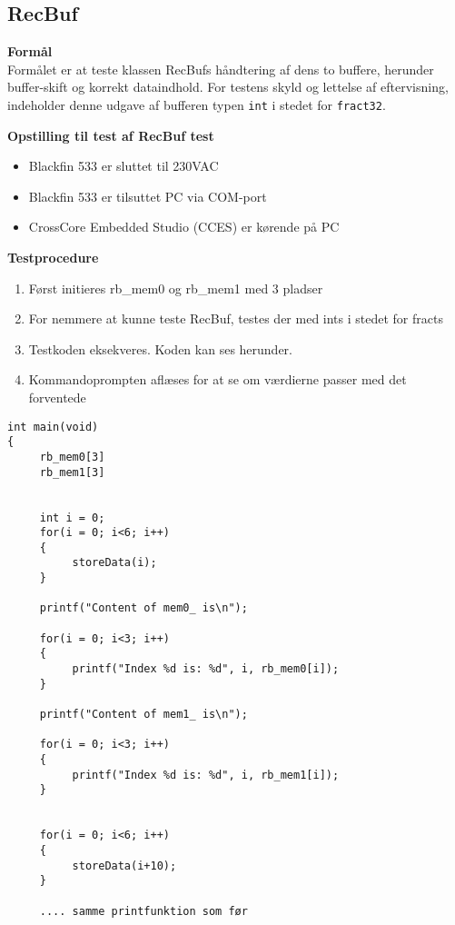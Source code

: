 \subsection*{RecBuf}

\textbf{Formål} \\
Formålet er at teste klassen RecBufs håndtering af dens to buffere, herunder buffer-skift og korrekt dataindhold. For testens skyld og lettelse af eftervisning, indeholder denne udgave af bufferen typen \verb+int+ i stedet for \verb+fract32+.

\textbf{Opstilling til test af RecBuf test}

\begin{itemize}
	\item Blackfin 533 er sluttet til 230VAC
	\item Blackfin 533 er tilsuttet PC via COM-port
	\item CrossCore Embedded Studio (CCES) er kørende på PC
\end{itemize}

\textbf{Testprocedure}
\begin{enumerate}
	\item Først initieres rb\_mem0 og rb\_mem1 med 3 pladser  
	\item For nemmere at kunne teste RecBuf, testes der med ints i stedet for fracts
	\item Testkoden eksekveres. Koden kan ses herunder. 
	\item Kommandoprompten aflæses for at se om værdierne passer med det forventede
\end{enumerate}

\begin{verbatim}
int main(void)
{
     rb_mem0[3]
     rb_mem1[3]
     
     
     int i = 0;
     for(i = 0; i<6; i++)
     {
          storeData(i);
     }
     
     printf("Content of mem0_ is\n");
     
     for(i = 0; i<3; i++)
     {
          printf("Index %d is: %d", i, rb_mem0[i]);
     }
     
     printf("Content of mem1_ is\n");
     
     for(i = 0; i<3; i++)
     {
          printf("Index %d is: %d", i, rb_mem1[i]);
     }


     for(i = 0; i<6; i++)
     {
          storeData(i+10);
     }
     
     .... samme printfunktion som før      
\end{verbatim}

